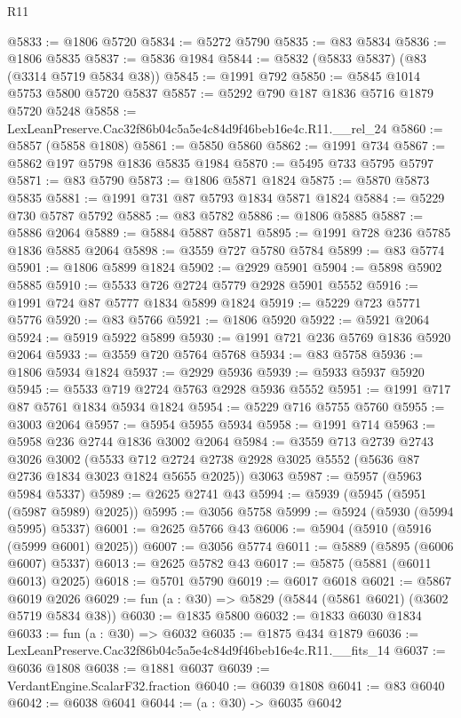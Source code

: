 \begin{lexlean}{R11}
\begin{coremodule}
@5833 := @1806 @5720
@5834 := @5272 @5790
@5835 := @83 @5834
@5836 := @1806 @5835
@5837 := @5836 @1984
@5844 := @5832 (@5833 @5837) (@83 (@3314 @5719 @5834 @38))
@5845 := @1991 @792
@5850 := @5845 @1014 @5753 @5800 @5720 @5837
@5857 := @5292 @790 @187 @1836 @5716 @1879 @5720 @5248
@5858 := LexLeanPreserve.Cac32f86b04c5a5e4c84d9f46beb16e4c.R11.__rel_24
@5860 := @5857 (@5858 @1808)
@5861 := @5850 @5860
@5862 := @1991 @734
@5867 := @5862 @197 @5798 @1836 @5835 @1984
@5870 := @5495 @733 @5795 @5797
@5871 := @83 @5790
@5873 := @1806 @5871 @1824
@5875 := @5870 @5873 @5835
@5881 := @1991 @731 @87 @5793 @1834 @5871 @1824
@5884 := @5229 @730 @5787 @5792
@5885 := @83 @5782
@5886 := @1806 @5885
@5887 := @5886 @2064
@5889 := @5884 @5887 @5871
@5895 := @1991 @728 @236 @5785 @1836 @5885 @2064
@5898 := @3559 @727 @5780 @5784
@5899 := @83 @5774
@5901 := @1806 @5899 @1824
@5902 := @2929 @5901
@5904 := @5898 @5902 @5885
@5910 := @5533 @726 @2724 @5779 @2928 @5901 @5552
@5916 := @1991 @724 @87 @5777 @1834 @5899 @1824
@5919 := @5229 @723 @5771 @5776
@5920 := @83 @5766
@5921 := @1806 @5920
@5922 := @5921 @2064
@5924 := @5919 @5922 @5899
@5930 := @1991 @721 @236 @5769 @1836 @5920 @2064
@5933 := @3559 @720 @5764 @5768
@5934 := @83 @5758
@5936 := @1806 @5934 @1824
@5937 := @2929 @5936
@5939 := @5933 @5937 @5920
@5945 := @5533 @719 @2724 @5763 @2928 @5936 @5552
@5951 := @1991 @717 @87 @5761 @1834 @5934 @1824
@5954 := @5229 @716 @5755 @5760
@5955 := @3003 @2064
@5957 := @5954 @5955 @5934
@5958 := @1991 @714
@5963 := @5958 @236 @2744 @1836 @3002 @2064
@5984 := @3559
    @713
    @2739
    @2743
    @3026
    @3002
    (@5533 @712 @2724 @2738 @2928 @3025 @5552 (@5636 @87 @2736 @1834 @3023 @1824 @5655 @2025))
    @3063
@5987 := @5957 (@5963 @5984 @5337)
@5989 := @2625 @2741 @43
@5994 := @5939 (@5945 (@5951 (@5987 @5989) @2025))
@5995 := @3056 @5758
@5999 := @5924 (@5930 (@5994 @5995) @5337)
@6001 := @2625 @5766 @43
@6006 := @5904 (@5910 (@5916 (@5999 @6001) @2025))
@6007 := @3056 @5774
@6011 := @5889 (@5895 (@6006 @6007) @5337)
@6013 := @2625 @5782 @43
@6017 := @5875 (@5881 (@6011 @6013) @2025)
@6018 := @5701 @5790
@6019 := @6017 @6018
@6021 := @5867 @6019 @2026
@6029 := fun (a : @30) => @5829 (@5844 (@5861 @6021) (@3602 @5719 @5834 @38))
@6030 := @1835 @5800
@6032 := @1833 @6030 @1834
@6033 := fun (a : @30) => @6032
@6035 := @1875 @434 @1879
@6036 := LexLeanPreserve.Cac32f86b04c5a5e4c84d9f46beb16e4c.R11.__fits_14
@6037 := @6036 @1808
@6038 := @1881 @6037
@6039 := VerdantEngine.ScalarF32.fraction
@6040 := @6039 @1808
@6041 := @83 @6040
@6042 := @6038 @6041
@6044 := (a : @30) -> @6035 @6042

\end{coremodule}
\end{lexlean}

